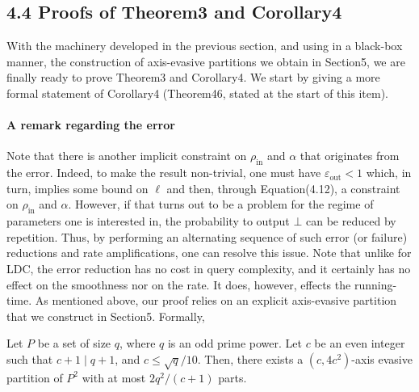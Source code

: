 \subsection*{4.4 Proofs of Theorem3 and Corollary4}
With the machinery developed in the previous section, and using in a black-box manner, the construction of axis-evasive partitions we obtain in Section5, we are finally ready to prove Theorem3 and Corollary4. We start by giving a more formal statement of Corollary4 (Theorem46, stated at the start of this item).
\paragraph{A remark regarding the error}
Note that there is another implicit constraint on $\rho_{\mathrm{in}}$ and $\alpha$ that originates from the error. Indeed, to make the result non-trivial, one must have $\varepsilon_{\mathrm{out}}<1$ which, in turn, implies some bound on $\ell$ and then, through Equation(4.12), a constraint on $\rho_{\mathrm{in}}$ and $\alpha$. However, if that turns out to be a problem for the regime of parameters one is interested in, the probability to output $\bot$ can be reduced by repetition. Thus, by performing an alternating sequence of such error (or failure) reductions and rate amplifications, one can resolve this issue. Note that unlike for LDC, the error reduction has no cost in query complexity, and it certainly has no effect on the smoothness nor on the rate. It does, however, effects the running-time.
As mentioned above, our proof relies on an explicit axis-evasive partition that we construct in Section5. Formally,
\setcounter{nttheorem}{46}
\begin{nttheorem}
Let $P$ be a set of size $q$, where $q$ is an odd prime power. Let $c$ be an even integer such that $c+1\mid q+1$, and $c\leq\sqrt q/10$. Then, there exists a $(c,4c^2)$-axis evasive partition of $P^2$ with at most $2q^2/(c+1)$ parts.
\end{nttheorem}
